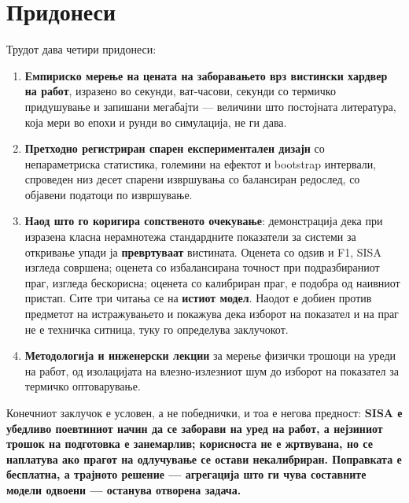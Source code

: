 \section{Придонеси}

Трудот дава четири придонеси:

\begin{enumerate}
  \item \textbf{Емпириско мерење на цената на заборавањето врз вистински хардвер на работ}, изразено во секунди, ват-часови, секунди со термичко придушување и запишани мегабајти --- величини што постојната литература, која мери во епохи и рунди во симулација, не ги дава.
  \item \textbf{Претходно регистриран спарен експериментален дизајн} со непараметриска статистика, големини на ефектот и bootstrap интервали, спроведен низ десет спарени извршувања со балансиран редослед, со објавени податоци по извршување.
  \item \textbf{Наод што го коригира сопственото очекување}: демонстрација дека при изразена класна нерамнотежа стандардните показатели за системи за откривање упади ја \textbf{превртуваат} вистината. Оценета со одѕив и F1, SISA изгледа совршена; оценета со избалансирана точност при подразбираниот праг, изгледа бескорисна; оценета со калибриран праг, е подобра од наивниот пристап. Сите три читања се на \textbf{истиот модел}. Наодот е добиен против предметот на истражувањето и покажува дека изборот на показател и на праг не е техничка ситница, туку го определува заклучокот.
  \item \textbf{Методологија и инженерски лекции} за мерење физички трошоци на уреди на работ, од изолацијата на влезно-излезниот шум до изборот на показател за термичко оптоварување.
\end{enumerate}

Конечниот заклучок е условен, а не победнички, и тоа е негова предност: \textbf{SISA е убедливо
поевтиниот начин да се заборави на уред на работ, а нејзиниот трошок на подготовка е
занемарлив; корисноста не е жртвувана, но се наплатува ако прагот на одлучување се остави
некалибриран. Поправката е бесплатна, а трајното решение --- агрегација што ги чува составните
модели одвоени --- останува отворена задача.}

